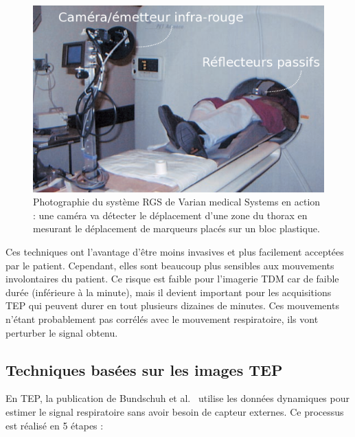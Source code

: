 \begin{figure}[h!]
	\begin{center}
		\includegraphics[width=12cm]{images/varian}
	\end{center}
	\caption[Photographie du système RGS de Varian medical Systems en action]{Photographie du système RGS de Varian medical Systems en action : une caméra va détecter le déplacement d'une zone du thorax en mesurant le déplacement de marqueurs placés sur un bloc plastique.} 
	\label{fig:RGSdeVarian}
\end{figure}

Ces techniques ont l'avantage d'être moins invasives et plus facilement acceptées par le patient. Cependant, elles sont beaucoup plus sensibles aux mouvements involontaires du patient. Ce risque est faible pour l'imagerie TDM car de faible durée (inférieure à la minute), mais il devient important pour les acquisitions TEP qui peuvent durer en tout plusieurs dizaines de minutes. Ces mouvements n'étant probablement pas corrélés avec le mouvement respiratoire, ils vont perturber le signal obtenu. 

\subsection{Techniques basées sur les images TEP}
\label{lab:estimMvtTEP}
En TEP, la publication de Bundschuh et al.~\cite{bundschuh2007postacquisition} utilise les données dynamiques pour estimer le signal respiratoire sans avoir besoin de capteur externes. Ce processus est réalisé en 5 étapes : 

